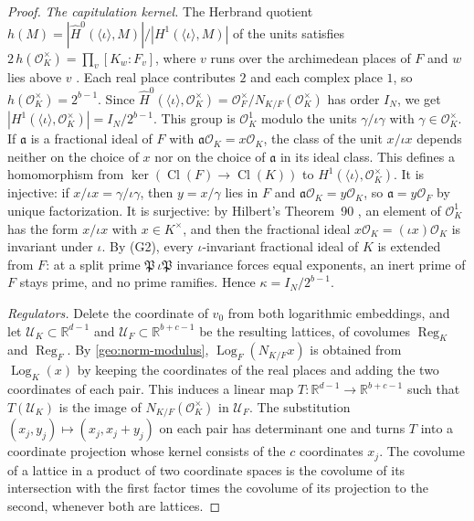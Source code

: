 \documentclass[11pt]{amsart}
\numberwithin{equation}{section}
\theoremstyle{definition}
\theoremstyle{remark}
\DeclareMathOperator{\Cl}{Cl}
\newcommand{\R}{\mathbb R}
\begin{document}
\begin{proof}
\emph{The capitulation kernel.} The Herbrand quotient
$h(M)=|\widehat H^0(\langle\iota\rangle,M)|/|H^1(\langle\iota\rangle,M)|$
\cite[Chapter~II, \S3]{MilneCFT} of the units satisfies
$2\,h(\mathcal O_K^\times)=\prod_v[K_w:F_v]$, where $v$ runs over the
archimedean places of $F$ and $w$ lies above $v$
\cite[Chapter~VII, Proposition~3.1]{MilneCFT}. Each real place
contributes $2$ and each complex place $1$, so
$h(\mathcal O_K^\times)=2^{b-1}$. Since
$\widehat H^0(\langle\iota\rangle,\mathcal O_K^\times)=\mathcal
O_F^\times/N_{K/F}(\mathcal O_K^\times)$ has order $I_N$, we get
$|H^1(\langle\iota\rangle,\mathcal O_K^\times)|=I_N/2^{b-1}$. This group
is $\mathcal O_K^1$ modulo the units $\gamma/\iota\gamma$ with
$\gamma\in\mathcal O_K^\times$. If $\mathfrak a$ is a fractional ideal
of $F$ with $\mathfrak a\mathcal O_K=x\mathcal O_K$, the class of the
unit $x/\iota x$ depends neither on the choice of $x$ nor on the choice
of $\mathfrak a$ in its ideal class. This defines a homomorphism from
$\ker(\Cl(F)\to\Cl(K))$ to $H^1(\langle\iota\rangle,\mathcal O_K^\times)$.
It is injective: if $x/\iota x=\gamma/\iota\gamma$, then $y=x/\gamma$
lies in $F$ and $\mathfrak a\mathcal O_K=y\mathcal O_K$, so
$\mathfrak a=y\mathcal O_F$ by unique factorization. It is surjective:
by Hilbert's Theorem~90 \cite[Chapter~II, Corollary~1.23]{MilneCFT}, an
element of $\mathcal O_K^1$ has the form $x/\iota x$ with
$x\in K^\times$, and then the fractional ideal
$x\mathcal O_K=(\iota x)\mathcal O_K$ is invariant under $\iota$. By
(G2), every $\iota$-invariant fractional ideal of $K$ is extended from
$F$: at a split prime $\mathfrak P\,\iota\mathfrak P$ invariance forces
equal exponents, an inert prime of $F$ stays prime, and no prime
ramifies. Hence $\kappa=I_N/2^{b-1}$.

\emph{Regulators.} Delete the coordinate of $v_0$ from both logarithmic
embeddings, and let $\mathcal U_K\subset\R^{d-1}$ and
$\mathcal U_F\subset\R^{b+c-1}$ be the resulting lattices, of covolumes
$\operatorname{Reg}_K$ and $\operatorname{Reg}_F$. By
\eqref{geo:norm-modulus}, $\operatorname{Log}_F(N_{K/F}x)$ is obtained
from $\operatorname{Log}_K(x)$ by keeping the coordinates of the real
places and adding the two coordinates of each pair. This induces a
linear map $T\colon\R^{d-1}\to\R^{b+c-1}$ such that
$T(\mathcal U_K)$ is the image of $N_{K/F}(\mathcal O_K^\times)$ in
$\mathcal U_F$. The substitution $(x_j,y_j)\mapsto(x_j,x_j+y_j)$ on each
pair has determinant one and turns $T$ into a coordinate projection
whose kernel consists of the $c$ coordinates $x_j$. The covolume of a
lattice in a product of two coordinate spaces is the covolume of its
intersection with the first factor times the covolume of its projection
to the second, whenever both are lattices.


\end{proof}
\end{document}
